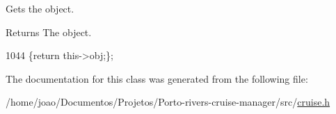 Gets the object. 

\begin{DoxyReturn}{Returns}
The object. 
\end{DoxyReturn}

\begin{DoxyCode}
1044 \{\textcolor{keywordflow}{return} this->obj;\};
\end{DoxyCode}


The documentation for this class was generated from the following file\+:\begin{DoxyCompactItemize}
\item 
/home/joao/\+Documentos/\+Projetos/\+Porto-\/rivers-\/cruise-\/manager/src/\hyperlink{cruise_8h}{cruise.\+h}\end{DoxyCompactItemize}
